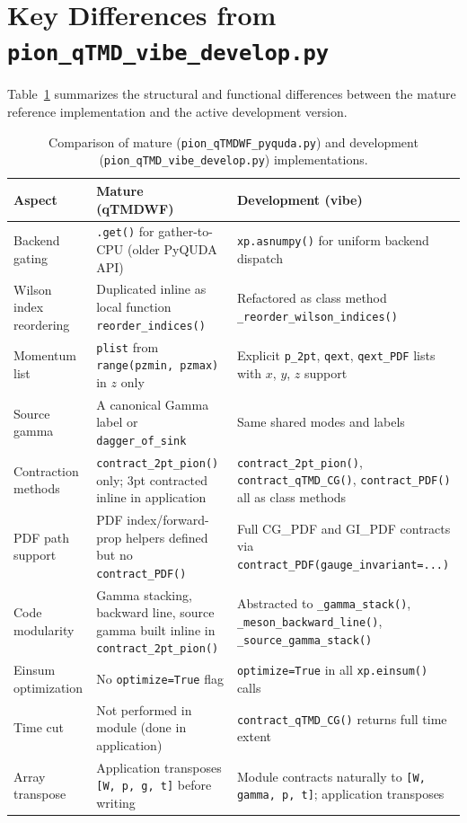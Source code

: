 \documentclass[11pt]{article}
\begin{document}
\section{Key Differences from \texttt{pion\_qTMD\_vibe\_develop.py}}
\label{sec:differences}

Table~\ref{tab:differences} summarizes the structural and functional differences between the mature reference implementation and the active development version.

\begin{table}[H]
\centering
\caption{Comparison of mature (\texttt{pion\_qTMDWF\_pyquda.py}) and development (\texttt{pion\_qTMD\_vibe\_develop.py}) implementations.}
\label{tab:differences}
\begin{tabular}{p{}p{}p{}}
\toprule
\textbf{Aspect} & \textbf{Mature (qTMDWF)} & \textbf{Development (vibe)} \\
\midrule
Backend gating & \texttt{.get()} for gather-to-CPU (older PyQUDA API) & \texttt{xp.asnumpy()} for uniform backend dispatch \\
\hline
Wilson index reordering & Duplicated inline as local function \texttt{reorder\_indices()} & Refactored as class method \texttt{\_reorder\_wilson\_indices()} \\
\hline
Momentum list & \texttt{plist} from \texttt{range(pzmin, pzmax)} in $z$ only & Explicit \texttt{p\_2pt}, \texttt{qext}, \texttt{qext\_PDF} lists with $x$, $y$, $z$ support \\
\hline
Source gamma & A canonical Gamma label or \texttt{dagger\_of\_sink} & Same shared modes and labels \\
\hline
Contraction methods & \texttt{contract\_2pt\_pion()} only; 3pt contracted inline in application & \texttt{contract\_2pt\_pion()}, \texttt{contract\_qTMD\_CG()}, \texttt{contract\_PDF()} all as class methods \\
\hline
PDF path support & PDF index/forward-prop helpers defined but no \texttt{contract\_PDF()} & Full CG\_PDF and GI\_PDF contracts via \texttt{contract\_PDF(gauge\_invariant=...)} \\
\hline
Code modularity & Gamma stacking, backward line, source gamma built inline in \texttt{contract\_2pt\_pion()} & Abstracted to \texttt{\_gamma\_stack()}, \texttt{\_meson\_backward\_line()}, \texttt{\_source\_gamma\_stack()} \\
\hline
Einsum optimization & No \texttt{optimize=True} flag & \texttt{optimize=True} in all \texttt{xp.einsum()} calls \\
\hline
Time cut & Not performed in module (done in application) & \texttt{contract\_qTMD\_CG()} returns full time extent \\
\hline
Array transpose & Application transposes \texttt{[W, p, g, t]} before writing & Module contracts naturally to \texttt{[W, gamma, p, t]}; application transposes \\
\bottomrule
\end{tabular}
\end{table}
\end{document}

